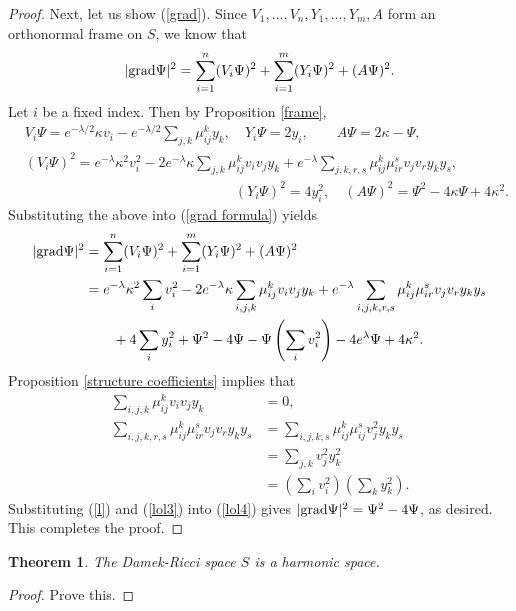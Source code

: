 \documentclass{amsart}
\newcommand{\grad}{\text{\normalfont grad}}
\newcommand{\alert}[1]{\color{red}#1\color{black}}
\theoremstyle{plain}
\newtheorem{theorem}{Theorem}
\theoremstyle{definition}
\theoremstyle{remark}
\begin{document}
\begin{proof}
		Next, let us show (\ref{grad}). Since $V_1,\ldots,V_n,Y_1,\ldots, Y_m, A$ form an orthonormal frame on $S$, we know that 
		\begin{equation}
			|\grad \Psi|^2 = \sum_{i=1}^n (V_i \Psi)^2 + \sum_{i=1}^m (Y_i \Psi)^2 + (A\Psi)^2. \label{grad formula}
		\end{equation}
		Let $i$ be a fixed index. Then by Proposition \ref{frame},
		\begin{align*}
			&V_i \Psi = e^{-\lambda/2} \kappa v_i - e^{-\lambda/2} \sum_{j,k} \mu_{ij}^k y_k, \quad Y_i \Psi = 2y_i, \qquad A\Psi = 2\kappa - \Psi, \\
			&(V_i \Psi)^2 = e^{-\lambda} \kappa^2 v_i^2 - 2e^{-\lambda } \kappa\sum_{j,k} \mu_{ij}^k v_i v_j y_k + e^{-\lambda} \sum_{j,k,r,s} \mu_{ij}^k \mu_{ir}^s v_j v_r y_k y_s, \\
			&\quad\qquad\qquad\qquad\qquad\qquad\qquad\qquad(Y_i \Psi)^2 = 4 y_i^2, \quad (A\Psi)^2 = \Psi^2 -4 \kappa \Psi + 4\kappa^2.
		\end{align*}
		Substituting the above into (\ref{grad formula}) yields
		\begin{align}
			\begin{split}
				\label{lol4}
				|\grad \Psi|^2 &= \sum_{i=1}^n (V_i \Psi)^2 + \sum_{i=1}^m (Y_i \Psi)^2 + (A\Psi)^2 \\
				&= e^{-\lambda} \kappa^2 \sum_i v_i^2 - 2e^{-\lambda } \kappa\sum_{i,j,k} \mu_{ij}^k v_i v_j y_k + e^{-\lambda} \sum_{i, j,k,r,s} \mu_{ij}^k \mu_{ir}^s v_j v_r y_k y_s \\
				& \qquad + 4 \sum_{i} y_i^2+ \Psi^2 -4\Psi - \Psi\left(\sum_i v_i^2\right)  -4e^\lambda \Psi+ 4\kappa^2.
			\end{split}
		\end{align}
		Proposition \ref{structure coefficients} implies that 
		\begin{align}
			\sum_{i,j,k} \mu_{ij}^k v_i v_j y_k  &= 0,\label{l} \\
			\sum_{i, j,k,r,s} \mu_{ij}^k \mu_{ir}^s v_j v_r y_k y_s &= \sum_{i,j,k,s} \mu_{ij}^k \mu_{ij}^s v_j^2 y_k y_s  \nonumber \\
			&=\sum_{j,k} v_j^2 y_k^2 \nonumber \\
			&= \left(\sum_i v_i^2 \right) \left( \sum_k y_k^2\right). \label{lol3}
		\end{align}
		Substituting (\ref{l}) and (\ref{lol3}) into (\ref{lol4}) gives $|\grad \Psi|^2 = \Psi^2 - 4\Psi$,
		as desired. This completes the proof.
	\end{proof}



	\begin{theorem}
		The Damek-Ricci space $S$ is a harmonic space.
	\end{theorem}
	\begin{proof}
		\alert{Prove this.}
	\end{proof}
	
	

	
	
\end{document}
